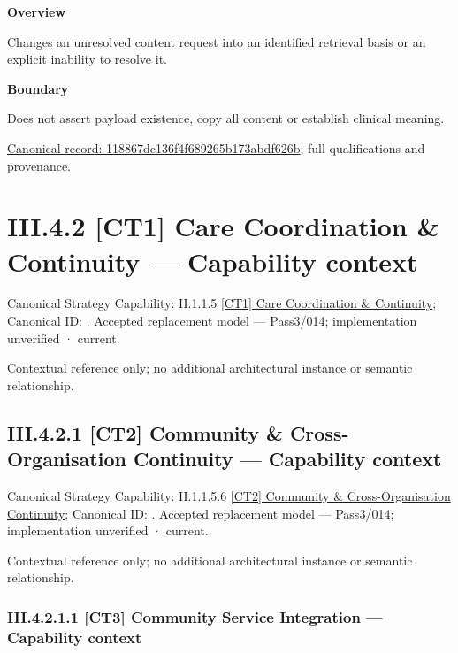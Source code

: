\textbf{Overview}



Changes an unresolved content request into an identified retrieval basis or an explicit inability to resolve it.



\textbf{Boundary}



Does not assert payload existence, copy all content or establish clinical meaning.


{\footnotesize \href{../../../../../../../../continuum/business/business-function/118867dc136f4f689265b173abdf626b.md}{Canonical record: 118867dc136f4f689265b173abdf626b}; full qualifications and provenance.}\par
\section*{III.4.2 [CT1] Care Coordination \& Continuity — Capability context}
\label{navigation:III.4.2}

{\small Canonical Strategy Capability: II.1.1.5 \hyperref[element:08b0075a1fa14d30a54bef177da8251a]{[CT1] Care Coordination \& Continuity}; Canonical ID: \texttt{}. Accepted replacement model — Pass3/014; implementation unverified · current.}\par
Contextual reference only; no additional architectural instance or semantic relationship.\par
\subsection*{III.4.2.1 [CT2] Community \& Cross-Organisation Continuity — Capability context}
\label{navigation:III.4.2.1}

{\small Canonical Strategy Capability: II.1.1.5.6 \hyperref[element:05573745dd0a400dad02e09985daf14f]{[CT2] Community \& Cross-Organisation Continuity}; Canonical ID: \texttt{}. Accepted replacement model — Pass3/014; implementation unverified · current.}\par
Contextual reference only; no additional architectural instance or semantic relationship.\par
\subsubsection*{III.4.2.1.1 [CT3] Community Service Integration — Capability context}
\label{navigation:III.4.2.1.1}

